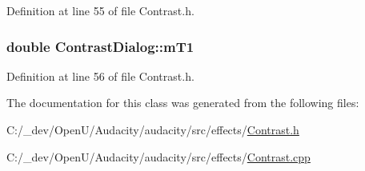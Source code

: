 Definition at line 55 of file Contrast.\+h.

\subsubsection[{\texorpdfstring{m\+T1}{mT1}}]{\setlength{\rightskip}{0pt plus 5cm}double Contrast\+Dialog\+::m\+T1}\hypertarget{class_contrast_dialog_a672a5191ac669ca334c0f56129fbf718}{}\label{class_contrast_dialog_a672a5191ac669ca334c0f56129fbf718}


Definition at line 56 of file Contrast.\+h.



The documentation for this class was generated from the following files\+:\begin{DoxyCompactItemize}
\item 
C\+:/\+\_\+dev/\+Open\+U/\+Audacity/audacity/src/effects/\hyperlink{_contrast_8h}{Contrast.\+h}\item 
C\+:/\+\_\+dev/\+Open\+U/\+Audacity/audacity/src/effects/\hyperlink{_contrast_8cpp}{Contrast.\+cpp}\end{DoxyCompactItemize}
